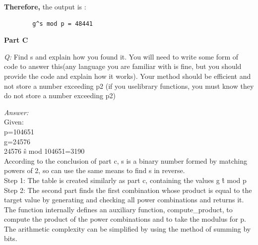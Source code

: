 \documentclass{article}
\begin{document}
	\textbf{Therefore,} 
	the output is :
	\begin{lstlisting}
		g^s mod p = 48441
	\end{lstlisting}
	
	\textbf{Part C}

	\textit{Q:} Find s and explain how you found it. You will need to write some form of code to answer this(any language you are familiar with is fine, but you should provide the code and explain how it works). Your method should be efficient and not store a number exceeding p2	(if you uselibrary functions, you must know they do not store a number exceeding p2)
	
	\textit{Answer:} \\
	Given:\\
	p=104651\\
	g=24576\\
	24576 \^ s mod 104651=3190\\
	
	According to the conclusion of part c, s is a binary number formed by matching powers of 2, so can use the same means to find s in reverse.\\
	
	Step 1: The table is created similarly as part c, containing the values g \^t mod p\\

	Step 2: The second part finds the first combination whose product is equal to the target value by generating and checking all power combinations and returns it. The function internally defines an auxiliary function, compute\_product, to compute the product of the power combinations and to take the modulus for p. The arithmetic complexity can be simplified by using the method of summing by bits.\\
	
\end{document}
